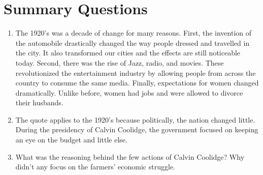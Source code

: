 \documentclass[12pt]{article} %
\begin{document}
\section{Summary Questions}
\begin{enumerate}
	\item The 1920's was a decade of change for many reasons. First, the invention of the automobile drastically changed
		the way people dressed and travelled in the city. It also transformed our cities and the effects are still noticeable
		today. Second, there was the rise of Jazz, radio, and movies. These revolutionized the entertainment industry by allowing
		people from across the country to consume the same media. Finally, expectations for women changed dramatically. Unlike
		before, women had jobs and were allowed to divorce their husbands.
	\item The quote applies to the 1920's because politically, the nation changed little. During the presidency of Calvin
		Coolidge, the government focused on keeping an eye on the budget and little else. 
	\item What was the reasoning behind the few actions of Calvin Coolidge? Why didn't any focus on the farmers' economic struggle.
\end{enumerate}
\end{document}
